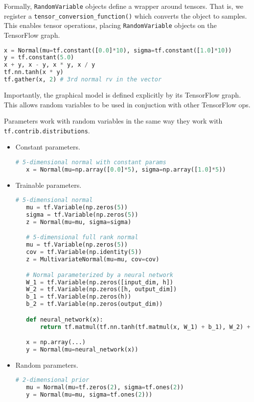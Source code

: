 Formally, \texttt{RandomVariable} objects define a wrapper around tensors. That is,
we register a \texttt{tensor_conversion_function()} which converts the object to
samples. This enables tensor operations, placing \texttt{RandomVariable}
objects on the TensorFlow graph.

\begin{lstlisting}[language=Python]
x = Normal(mu=tf.constant([0.0]*10), sigma=tf.constant([1.0]*10))
y = tf.constant(5.0)
x + y, x - y, x * y, x / y
tf.nn.tanh(x * y)
tf.gather(x, 2) # 3rd normal rv in the vector
\end{lstlisting}

Importantly, the graphical model is defined explicitly by its
TensorFlow graph. This allows random variables to be used in
conjuction with other TensorFlow ops.

Parameters work with random variables in the same way they
work with \texttt{tf.contrib.distributions}.

\begin{itemize}
\item
   Constant parameters.

  \begin{lstlisting}[language=Python]
   # 5-dimensional normal with constant params
   x = Normal(mu=np.array([0.0]*5), sigma=np.array([1.0]*5))
  \end{lstlisting}
\item
   Trainable parameters.

  \begin{lstlisting}[language=Python]
   # 5-dimensional normal
   mu = tf.Variable(np.zeros(5))
   sigma = tf.Variable(np.zeros(5))
   z = Normal(mu=mu, sigma=sigma)

   # 5-dimensional full rank normal
   mu = tf.Variable(np.zeros(5))
   cov = tf.Variable(np.identity(5))
   z = MultivariateNormal(mu=mu, cov=cov)

   # Normal parameterized by a neural network
   W_1 = tf.Variable(np.zeros([input_dim, h])
   W_2 = tf.Variable(np.zeros([h, output_dim])
   b_1 = tf.Variable(np.zeros(h))
   b_2 = tf.Variable(np.zeros(output_dim))

   def neural_network(x):
       return tf.matmul(tf.nn.tanh(tf.matmul(x, W_1) + b_1), W_2) + b_2

   x = np.array(...)
   y = Normal(mu=neural_network(x))
  \end{lstlisting}
\item
   Random parameters.

  \begin{lstlisting}[language=Python]
   # 2-dimensional prior
   mu = Normal(mu=tf.zeros(2), sigma=tf.ones(2))
   y = Normal(mu=mu, sigma=tf.ones(2)))
  \end{lstlisting}
\end{itemize}

